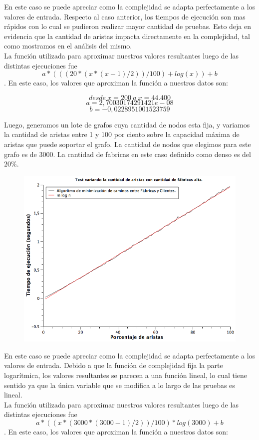 En este caso se puede apreciar como la complejidad se adapta perfectamente a los valores de entrada. Respecto al caso anterior, los tiempos de ejecución son mas rápidos con lo cual se pudieron realizar mayor cantidad de pruebas. Esto deja en evidencia que la cantidad de aristas impacta directamente en la complejidad, tal como mostramos en el análisis del mismo.\\
La función utilizada para aproximar nuestros valores resultantes luego de las distintas ejecuciones fue $$ a*(((20*(x*(x-1)/2)) / 100) + log(x)) + b $$.
En este caso, los valores que aproximan la función a nuestros datos son:

$$desde\ x = 200\ a\ x = 44.400 $$
$$a  = 2,70030174291421e-08$$
$$b  = -0,0228951001523759 $$


\newpage
Luego, generamos un lote de grafos cuya cantidad de nodos esta fija, y variamos la cantidad de aristas entre 1 y 100 por ciento sobre la capacidad máxima de aristas que puede soportar el grafo. La cantidad de nodos que elegimos para este grafo es de $3000$. La cantidad de fabricas en este caso definido como denso es del $20\%$.

\begin{figure}[H]
	\includegraphics[width=400pt]{../tests/ej3/EJ3-r-var-denso.png}
\end{figure}

En este caso se puede apreciar como la complejidad se adapta perfectamente a los valores de entrada. Debido a que la función de complejidad fija la parte logarítmica, los valores resultantes se parecen a una función lineal, lo cual tiene sentido ya que la única variable que se modifica a lo largo de las pruebas es lineal.\\
La función utilizada para aproximar nuestros valores resultantes luego de las distintas ejecuciones fue $$a*((x*(3000*(3000-1)/2))/100)*log(3000)+b $$.
En este caso, los valores que aproximan la función a nuestros datos son:

